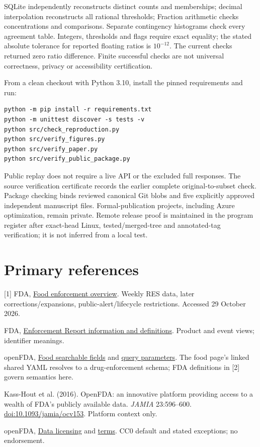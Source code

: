 \documentclass[10pt,letterpaper]{article}
\begin{document}
SQLite independently reconstructs distinct counts and memberships; decimal interpolation reconstructs all rational thresholds; Fraction arithmetic checks concentrations and comparisons. Separate contingency histograms check every agreement table. Integers, thresholds and flags require exact equality; the stated absolute tolerance for reported floating ratios is $10^{-12}$. The current checks returned zero ratio difference. Finite successful checks are not universal correctness, privacy or accessibility certification.

From a clean checkout with Python 3.10, install the pinned requirements and run:
\begin{verbatim}
python -m pip install -r requirements.txt
python -m unittest discover -s tests -v
python src/check_reproduction.py
python src/verify_figures.py
python src/verify_paper.py
python src/verify_public_package.py
\end{verbatim}
Public replay does not require a live API or the excluded full responses. The source verification certificate records the earlier complete original-to-subset check. Package checking binds reviewed canonical Git blobs and five explicitly approved independent manuscript files. Formal-publication projects, including Azure optimization, remain private. Remote release proof is maintained in the program register after exact-head Linux, tested/merged-tree and annotated-tag verification; it is not inferred from a local test.

\section*{Primary references}
\small
[1] FDA, \href{https://open.fda.gov/apis/food/enforcement/}{Food enforcement overview}. Weekly RES data, later corrections/expansions, public-alert/lifecycle restrictions. Accessed 29 October 2026.\par
[2] FDA, \href{https://www.fda.gov/safety/enforcement-reports/enforcement-report-information-and-definitions}{Enforcement Report information and definitions}. Product and event views; identifier meanings.\par
[3] openFDA, \href{https://open.fda.gov/apis/food/enforcement/searchable-fields/}{Food searchable fields} and \href{https://open.fda.gov/apis/query-parameters/}{query parameters}. The food page's linked shared YAML resolves to a drug-enforcement schema; FDA definitions in [2] govern semantics here.\par
[4] Kass-Hout et al. (2016). OpenFDA: an innovative platform providing access to a wealth of FDA's publicly available data. \emph{JAMIA} 23:596--600. \href{https://doi.org/10.1093/jamia/ocv153}{doi:10.1093/jamia/ocv153}. Platform context only.\par
[5] openFDA, \href{https://open.fda.gov/license/}{Data licensing} and \href{https://open.fda.gov/terms/}{terms}. CC0 default and stated exceptions; no endorsement.
\end{document}
